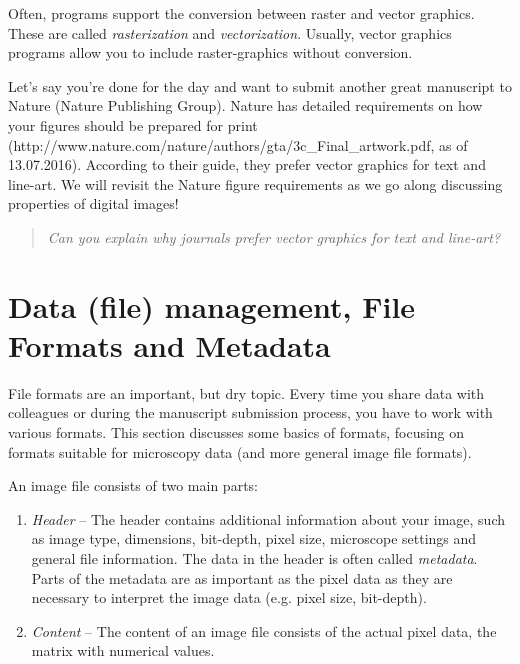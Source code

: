 Often, programs support the conversion between raster and vector graphics. These are called \emph{rasterization} and \emph{vectorization}. Usually, vector graphics programs allow you to include raster-graphics without conversion.

Let's say you're done for the day and want to submit another great manuscript to Nature (Nature Publishing Group). Nature has detailed requirements on how your figures should be prepared for print (http://www.nature.com/nature/authors/gta/3c\_Final\_artwork.pdf, as of 13.07.2016). According to their guide, they prefer vector graphics for text and line-art. We will revisit the Nature figure requirements as we go along discussing properties of digital images!

\begin{verse}
\emph{Can you explain why journals prefer vector graphics for text and line-art?}
\end{verse}

\section{Data (file) management, File Formats and Metadata}
File formats are an important, but dry topic. Every time you share data with colleagues or during the manuscript submission process, you have to work with various formats. This section discusses some basics of formats, focusing on formats suitable for microscopy data (and more general image file formats).

An image file consists of two main parts:
\begin{enumerate}
	\item \emph{Header} -- The header contains additional information about your image, such as image type, dimensions, bit-depth, pixel size, microscope settings and general file information. The data in the header is often called \emph{metadata}. Parts of the metadata are as important as the pixel data as they are necessary to interpret the image data (e.g. pixel size, bit-depth). 
	\item \emph{Content} -- The content of an image file consists of the actual pixel data, the matrix with numerical values. 
\end{enumerate}

